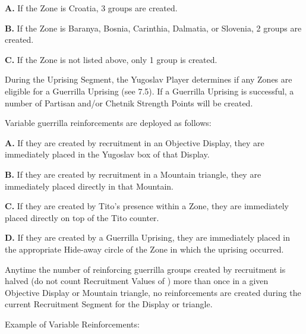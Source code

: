 \textbf{A.} If the Zone is Croatia, 3 groups are created.

\textbf{B.} If the Zone is Baranya, Bosnia, Carinthia, Dalmatia, or Slovenia, 2 groups are created.

\textbf{C.} If the Zone is not listed above, only 1 group is created.

 During the Uprising Segment, the Yugoslav Player determines if any Zones are eligible for a Guerrilla Uprising (see 7.5). If a Guerrilla Uprising is successful, a number of Partisan and/or Chetnik Strength Points will be created.

 Variable guerrilla reinforcements are deployed as follows:

\textbf{A.} If they are created by recruitment in an Objective Display, they are immediately placed in the Yugoslav box of that Display.

\textbf{B.} If they are created by recruitment in a Mountain triangle, they are immediately placed directly in that Mountain.

\textbf{C.} If they are created by Tito’s presence within a Zone, they are immediately placed directly on top of the Tito counter.

\textbf{D.} If they are created by a Guerrilla Uprising, they are immediately
placed in the appropriate Hide-away circle of the Zone in which the uprising
occurred.

 Anytime the number of reinforcing guerrilla groups created by recruitment is halved (do not count Recruitment Values of \textonehalf) more than once in a given Objective Display or Mountain triangle, no reinforcements are created during the current Recruitment Segment for the Display or triangle.

Example of Variable Reinforcements:

